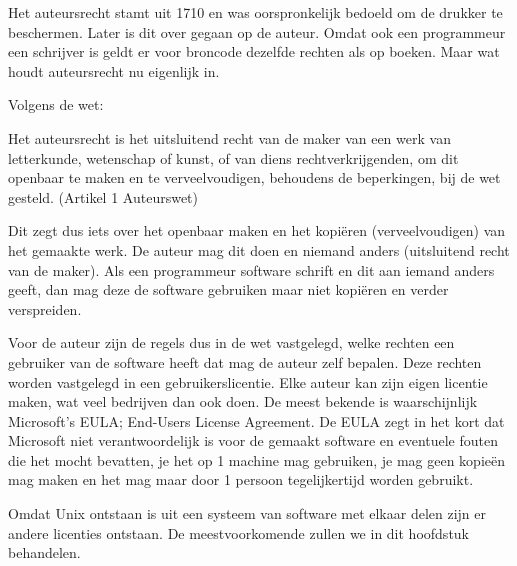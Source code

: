 Het auteursrecht stamt uit 1710 en was oorspronkelijk bedoeld om de drukker te beschermen. Later is dit over gegaan op
de auteur. Omdat ook een programmeur een schrijver is geldt er voor broncode dezelfde rechten als op boeken. Maar wat
houdt auteursrecht nu eigenlijk in.

{
Volgens de wet:}

{
{\textquotedbl}Het auteursrecht is het uitsluitend recht van de maker van een werk van letterkunde,
wetenschap of kunst, of van diens rechtverkrijgenden, om dit openbaar te maken en te verveelvoudigen, behoudens de
beperkingen, bij de wet gesteld.{\textquotedbl} (Artikel 1 Auteurswet) }

{
Dit zegt dus iets over het openbaar maken en het kopi\"eren (verveelvoudigen) van het gemaakte werk. De auteur mag dit
doen en niemand anders (uitsluitend recht van de maker). Als een programmeur software schrift en dit aan iemand anders
geeft, dan mag deze de software gebruiken maar niet kopi\"eren en verder verspreiden.}

{
Voor de auteur zijn de regels dus in de wet vastgelegd, welke rechten een gebruiker van de software heeft dat mag de
auteur zelf bepalen. Deze rechten worden vastgelegd in een gebruikerslicentie. Elke auteur kan zijn eigen licentie
maken, wat veel bedrijven dan ook doen. De meest bekende is waarschijnlijk Microsoft's EULA; End-Users
License Agreement. De EULA zegt in het kort dat Microsoft niet verantwoordelijk is voor de gemaakt software en
eventuele fouten die het mocht bevatten, je het op 1 machine mag gebruiken, je mag geen kopie\"en mag maken en het mag
maar door 1 persoon tegelijkertijd worden gebruikt.}

{
Omdat Unix ontstaan is uit een systeem van software met elkaar delen zijn er andere licenties ontstaan. De
meestvoorkomende zullen we in dit hoofdstuk behandelen.}

